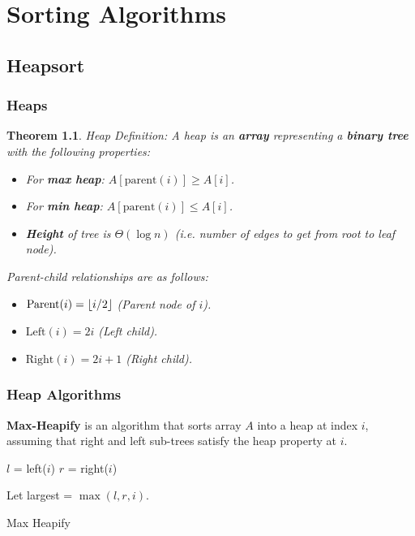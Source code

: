 \documentclass[a4paper,12pt]{report}
\newtheorem{theorem}{Theorem}
\DeclarePairedDelimiter{\floor}{\lfloor}{\rfloor}
\begin{document}
\chapter{Sorting Algorithms}


\section{Heapsort}
\subsection{Heaps}

\begin{theorem}{Heap Definition:}
A heap is an \textbf{array} representing a \textbf{binary tree} with the following properties:
\begin{itemize}
\item For \textbf{max heap}: $A[\text{parent}(i)] \geq A[i]$.
\item For \textbf{min heap}: $A[\text{parent}(i)] \leq A[i]$.
\item \textbf{Height} of tree is $\Theta(\log n)$ \textit{(i.e. number of edges to get from root to leaf node)}. 
\end{itemize}

Parent-child relationships are as follows:
\begin{itemize}
\item $\text{Parent}(i) = \floor{i/2}$ (Parent node of $i$).
\item $\text{Left}(i) = 2i$ (Left child).
\item $\text{Right}(i) = 2i+1$ (Right child).
\end{itemize}
\end{theorem}

\subsection{Heap Algorithms}

\textbf{Max-Heapify} is an algorithm that sorts array $A$ into a heap at index $i$, assuming that right and left sub-trees satisfy the heap property at $i$. 

\begin{algorithm}[H]
\SetAlgoLined
{}
    \BlankLine
    \BlankLine
    $l$ = left($i$)\;
    $r$ = right($i$)\;

    Let largest = $\max(l,r,i)$.
    
    \caption{Max Heapify}
\end{algorithm}
\end{document}
